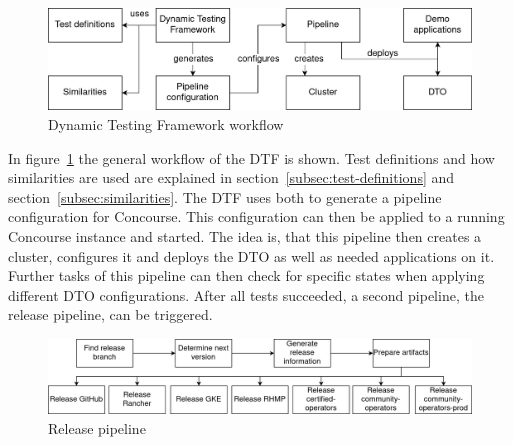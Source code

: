 \begin{figure}[H]
    \centering
    \includegraphics[width=\textwidth]{img/context/dtf}
    \caption{Dynamic Testing Framework workflow}
    \label{fig:dtf-workflow}
\end{figure}

In figure~\ref{fig:dtf-workflow} the general workflow of the DTF is shown.
Test definitions and how similarities are used are explained in section~\ref{subsec:test-definitions} and section~\ref{subsec:similarities}.
The DTF uses both to generate a pipeline configuration for Concourse.
This configuration can then be applied to a running Concourse instance and started.
The idea is, that this pipeline then creates a cluster, configures it and deploys the DTO as well as needed applications on it.
Further tasks of this pipeline can then check for specific states when applying different DTO configurations.
After all tests succeeded, a second pipeline, the release pipeline, can be triggered.

\begin{figure}[H]
    \centering
    \includegraphics[width=\textwidth]{img/context/release pipeline}
    \caption{Release pipeline}
    \label{fig:release-pipeline}
\end{figure}
